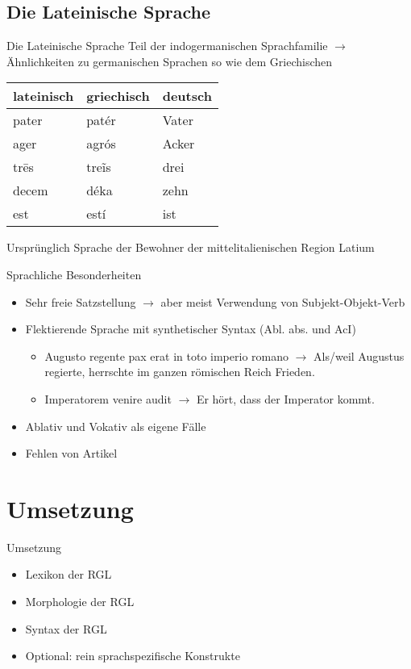 \documentclass{beamer}
\begin{document}
\subsection{Die Lateinische Sprache}
\begin{frame}[fragile]{Die Lateinische Sprache}
Teil der indogermanischen Sprachfamilie $\rightarrow$ Ähnlichkeiten zu germanischen Sprachen so wie dem Griechischen \\
\begin{center}
\begin{tabular}{|l|l|l|}
  \hline
  lateinisch & griechisch & deutsch \\
  \hline
  pater & patér & Vater \\
  ager & agrós & Acker \\
  trēs & treĩs & drei \\
  decem & déka & zehn \\
  est & estí & ist \\
  \hline
\end{tabular}
\end{center}
Ursprünglich Sprache der Bewohner der mittelitalienischen Region Latium
\end{frame}
\begin{frame}{Sprachliche Besonderheiten}
\begin{itemize}
  \item Sehr freie Satzstellung $\rightarrow$ aber meist Verwendung von Subjekt-Objekt-Verb
  \item Flektierende Sprache mit synthetischer Syntax (Abl. abs. und AcI)
    \begin{itemize}
      \item Augusto regente pax erat in toto imperio romano $\rightarrow$ Als/weil Augustus regierte, herrschte im ganzen römischen Reich Frieden.
      \item Imperatorem venire audit $\rightarrow$ Er hört, dass der Imperator kommt.
    \end{itemize}
  \item Ablativ und Vokativ als eigene Fälle
  \item Fehlen von Artikel
\end{itemize}
\end{frame}
\section{Umsetzung}
\begin{frame}{Umsetzung}
\begin{itemize}
  \item Lexikon der RGL
  \item Morphologie der RGL
  \item Syntax der RGL
  \item Optional: rein sprachspezifische Konstrukte
\end{itemize}
\end{frame}
\end{document}
